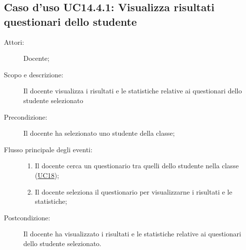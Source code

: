 \subsection{Caso d'uso UC14.4.1: Visualizza risultati questionari dello studente}\begin{description}
\item[Attori:] Docente;
\item[Scopo e descrizione:] Il docente visualizza i risultati e le statistiche relative ai questionari dello studente selezionato
      \item[Precondizione:] Il docente ha selezionato uno studente della classe;

        \item[Flusso principale degli eventi:] \begin{enumerate}
          \item Il docente cerca un questionario tra quelli dello studente nella classe (\hyperlink{UC18}{UC18});
          \item Il docente seleziona il questionario per visualizzarne i risultati e le statistiche;

      \end{enumerate}
    \item[Postcondizione:] Il docente ha visualizzato i risultati e le statistiche relative ai questionari dello studente selezionato.
  \end{description}
\hypertarget{UC15}{}
